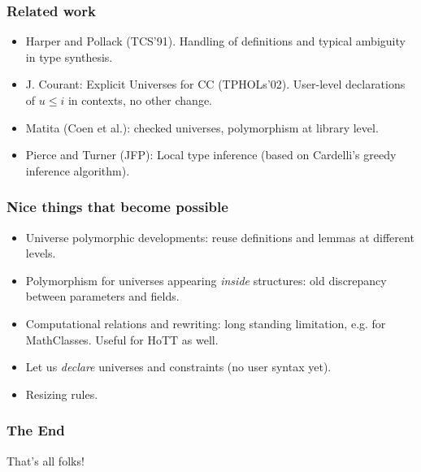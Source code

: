 \begin{frame}
  \frametitle{Related work}
  
  \begin{itemize}
  \item Harper and Pollack (TCS'91). Handling of definitions and typical
    ambiguity in type synthesis.
  \item J. Courant: Explicit Universes for CC (TPHOLs'02). 
    User-level declarations of $u \leq i$ in contexts, no other change.
  \item Matita (Coen et al.): checked universes, polymorphism at library
    level.
  \item Pierce and Turner (JFP): Local type inference (based on
    Cardelli's greedy inference algorithm).
  \end{itemize}
  
\end{frame}

\begin{frame}
  \frametitle{Nice things that become possible}

  \begin{itemize}
  \item Universe polymorphic developments: reuse definitions and lemmas
    at different levels.
  \item Polymorphism for universes appearing \emph{inside} structures: 
    old discrepancy between parameters and fields.
  \item Computational relations and rewriting:
    long standing limitation, e.g. for MathClasses.
    Useful for HoTT as well.
  \item Let us \emph{declare} universes and constraints (no user syntax yet).
  \item Resizing rules.
  \end{itemize}
  
\end{frame}



\begin{frame}
  \frametitle{The End}
  \begin{center}
    {\Huge That's all folks!}
  \end{center}
  
\end{frame}


